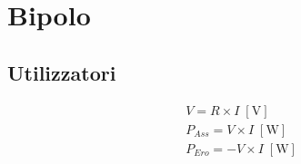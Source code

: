 \documentclass{article}
\begin{document}
    \section*{Bipolo}

        \begin{minipage}[t]{.3\textwidth}
            \vspace{-\baselineskip}

            \subsection*{Utilizzatori}

                \begin{minipage}[t]{.2\textwidth}
                    \vspace{-\baselineskip}

                    
                \end{minipage}
                \hfill
                \begin{minipage}[t]{.8\textwidth}
                    \vspace{-1.5\baselineskip}

                    \begin{align*}
                        &V = R \times I \; [\mathrm{V}]\\
                        &P_{Ass} = V \times I \; [\mathrm{W}]\\
                        &P_{Ero} = - V \times I \; [\mathrm{W}]
                    \end{align*}
                \end{minipage}

        \end{minipage}
        \hfill
\end{document}
